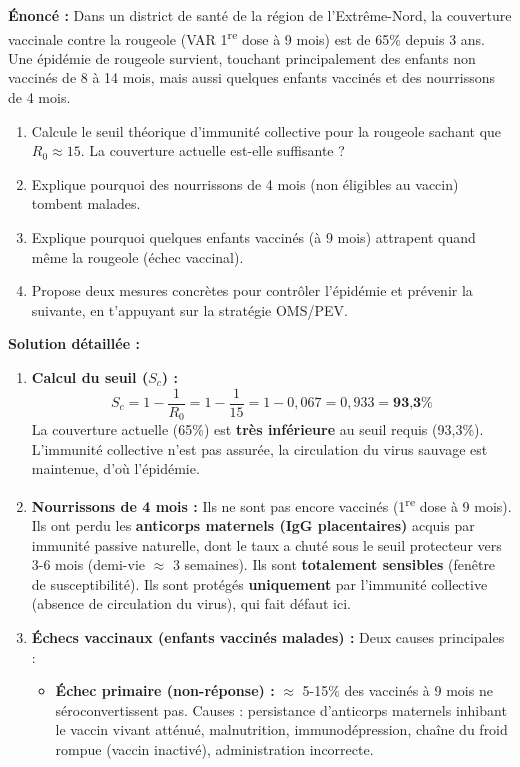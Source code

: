 \documentclass[11pt]{article}
\begin{document}
\begin{exoresolu}
    \textbf{Énoncé :} Dans un district de santé de la région de l'Extrême-Nord, la couverture vaccinale contre la rougeole (VAR 1\textsuperscript{re} dose à 9 mois) est de 65\% depuis 3 ans. Une épidémie de rougeole survient, touchant principalement des enfants non vaccinés de 8 à 14 mois, mais aussi quelques enfants vaccinés et des nourrissons de 4 mois.
    \begin{enumerate}
        \item Calcule le seuil théorique d'immunité collective pour la rougeole sachant que $R_0 \approx 15$. La couverture actuelle est-elle suffisante ?
        \item Explique pourquoi des nourrissons de 4 mois (non éligibles au vaccin) tombent malades.
        \item Explique pourquoi quelques enfants vaccinés (à 9 mois) attrapent quand même la rougeole (échec vaccinal).
        \item Propose deux mesures concrètes pour contrôler l'épidémie et prévenir la suivante, en t'appuyant sur la stratégie OMS/PEV.
    \end{enumerate}
    \tcblower
    \textbf{Solution détaillée :}
    \begin{enumerate}
        \item \textbf{Calcul du seuil ($S_c$) :}
        \[ S_c = 1 - \frac{1}{R_0} = 1 - \frac{1}{15} = 1 - 0,067 = 0,933 = \textbf{93,3\%} \]
        La couverture actuelle (65\%) est \textbf{très inférieure} au seuil requis (93,3\%). L'immunité collective n'est pas assurée, la circulation du virus sauvage est maintenue, d'où l'épidémie.
        \item \textbf{Nourrissons de 4 mois :} Ils ne sont pas encore vaccinés (1\textsuperscript{re} dose à 9 mois). Ils ont perdu les \textbf{anticorps maternels (IgG placentaires)} acquis par immunité passive naturelle, dont le taux a chuté sous le seuil protecteur vers 3-6 mois (demi-vie $\approx$ 3 semaines). Ils sont \textbf{totalement sensibles} (fenêtre de susceptibilité). Ils sont protégés \textbf{uniquement} par l'immunité collective (absence de circulation du virus), qui fait défaut ici.
        \item \textbf{Échecs vaccinaux (enfants vaccinés malades) :} Deux causes principales :
        \begin{itemize}
            \item \textbf{Échec primaire (non-réponse) :} $\approx$ 5-15\% des vaccinés à 9 mois ne séroconvertissent pas. Causes : persistance d'anticorps maternels inhibant le vaccin vivant atténué, malnutrition, immunodépression, chaîne du froid rompue (vaccin inactivé), administration incorrecte.

\end{itemize}
\end{enumerate}
\end{exoresolu}
\end{document}
